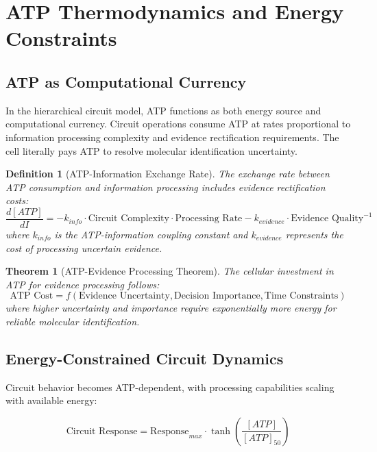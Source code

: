 \documentclass[12pt,a4paper]{article}
\newtheorem{theorem}{Theorem}
\newtheorem{definition}{Definition}
\begin{document}
\section{ATP Thermodynamics and Energy Constraints}

\subsection{ATP as Computational Currency}

In the hierarchical circuit model, ATP functions as both energy source and computational currency. Circuit operations consume ATP at rates proportional to information processing complexity and evidence rectification requirements. The cell literally pays ATP to resolve molecular identification uncertainty.

\begin{definition}[ATP-Information Exchange Rate]
The exchange rate between ATP consumption and information processing includes evidence rectification costs:
\begin{equation}
\frac{d[ATP]}{dI} = -k_{info} \cdot \text{Circuit Complexity} \cdot \text{Processing Rate} - k_{evidence} \cdot \text{Evidence Quality}^{-1}
\end{equation}
where $k_{info}$ is the ATP-information coupling constant and $k_{evidence}$ represents the cost of processing uncertain evidence.
\end{definition}

\begin{theorem}[ATP-Evidence Processing Theorem]
The cellular investment in ATP for evidence processing follows:
\begin{equation}
\text{ATP Cost} = f(\text{Evidence Uncertainty}, \text{Decision Importance}, \text{Time Constraints})
\end{equation}
where higher uncertainty and importance require exponentially more energy for reliable molecular identification.
\end{theorem}

\subsection{Energy-Constrained Circuit Dynamics}

Circuit behavior becomes ATP-dependent, with processing capabilities scaling with available energy:

\begin{equation}
\text{Circuit Response} = \text{Response}_{max} \cdot \tanh\left(\frac{[ATP]}{[ATP]_{50}}\right)
\end{equation}
\end{document}
